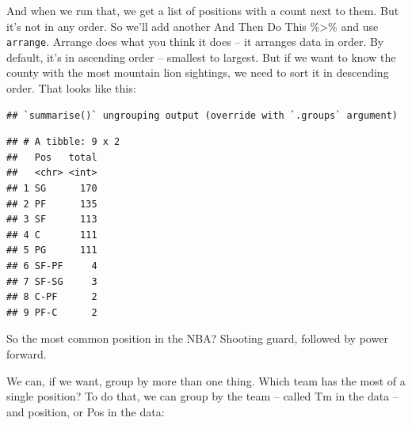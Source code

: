 \documentclass[
]{book}
\newenvironment{Shaded}{\begin{snugshade}}{\end{snugshade}}
\newcommand{\DataTypeTok}[1]{\textcolor[rgb]{0.13,0.29,0.53}{#1}}
\newcommand{\KeywordTok}[1]{\textcolor[rgb]{0.13,0.29,0.53}{\textbf{#1}}}
\newcommand{\NormalTok}[1]{#1}
\newcommand{\OperatorTok}[1]{\textcolor[rgb]{0.81,0.36,0.00}{\textbf{#1}}}
\newcommand{\StringTok}[1]{\textcolor[rgb]{0.31,0.60,0.02}{#1}}
\begin{document}
And when we run that, we get a list of positions with a count next to them. But it's not in any order. So we'll add another And Then Do This \%\textgreater\% and use \texttt{arrange}. Arrange does what you think it does -- it arranges data in order. By default, it's in ascending order -- smallest to largest. But if we want to know the county with the most mountain lion sightings, we need to sort it in descending order. That looks like this:

\begin{Shaded}
\end{Shaded}

\begin{verbatim}
## `summarise()` ungrouping output (override with `.groups` argument)
\end{verbatim}

\begin{verbatim}
## # A tibble: 9 x 2
##   Pos   total
##   <chr> <int>
## 1 SG      170
## 2 PF      135
## 3 SF      113
## 4 C       111
## 5 PG      111
## 6 SF-PF     4
## 7 SF-SG     3
## 8 C-PF      2
## 9 PF-C      2
\end{verbatim}

So the most common position in the NBA? Shooting guard, followed by power forward.

We can, if we want, group by more than one thing. Which team has the most of a single position? To do that, we can group by the team -- called Tm in the data -- and position, or Pos in the data:

\begin{Shaded}
\end{Shaded}
\end{document}
